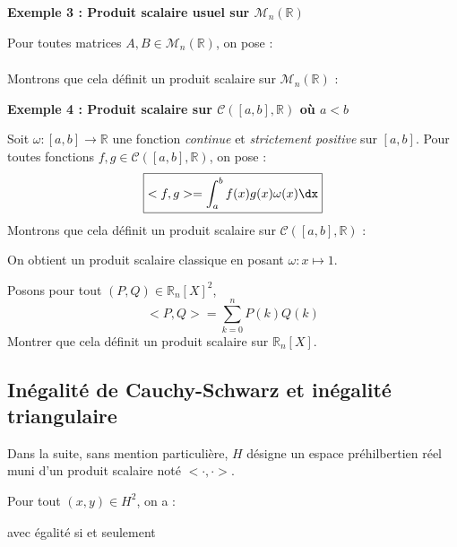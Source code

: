 \documentclass[a4paper,10pt]{report}
\begin{document}
\medskip

\noindent \textbf{Exemple 3 : Produit scalaire usuel sur $\mathcal{M}_{n}(\mathbb{R})$}

\noindent Pour toutes matrices $A,B \in \mathcal{M}_n(\mathbb{R})$, on pose :
$$ \phantom{\boxed{<A,B> = \textrm{Tr}(~^tA B)}} $$
Montrons que cela définit un produit scalaire sur $\mathcal{M}_n(\mathbb{R})$ :


\vspace{6cm}

\newpage

\phantom{test}

\vspace{3cm}

\noindent \textbf{Exemple 4 : Produit scalaire sur $\mathcal{C}([a,b], \mathbb{R})$ où $a<b$}

\noindent Soit $\omega : [a,b] \rightarrow \mathbb{R}$ une fonction \textit{continue} et \textit{strictement positive} sur $[a,b]$. Pour toutes fonctions $f,g \in \mathcal{C}([a,b], \mathbb{R})$, on pose :
$$ \boxed{<f,g> = \int_{a}^b f(x) g(x) \omega(x) \dx}$$
Montrons que cela définit un produit scalaire sur $\mathcal{C}([a,b], \mathbb{R})$ :

\vspace{8.5cm}

\begin{rem} On obtient un produit scalaire classique en posant $ \omega : x \mapsto 1$.
\end{rem}

\begin{exa} Posons pour tout $(P,Q) \in \mathbb{R}_n[X]^2$,
$$ <P,Q> = \sum_{k=0}^n P(k) Q(k) $$
Montrer que cela définit un produit scalaire sur $\mathbb{R}_n[X]$.
\end{exa}

\subsection{Inégalité de Cauchy-Schwarz et inégalité triangulaire}
\noindent Dans la suite, sans mention particulière, $H$ désigne un espace préhilbertien réel muni d'un produit scalaire noté $< \cdot , \cdot>$.
\begin{thm} Pour tout $(x,y) \in H^2$, on a :
$$ \phantom{\vert <x,y> \vert \leq \sqrt{<x,x>} \sqrt{<y,y>}}$$
avec égalité si et seulement \phantom{si $x$ et $y$ sont colinéaires.}
\end{thm}

\begin{preuve}

\vspace{10cm}
\end{preuve}
\end{document}
